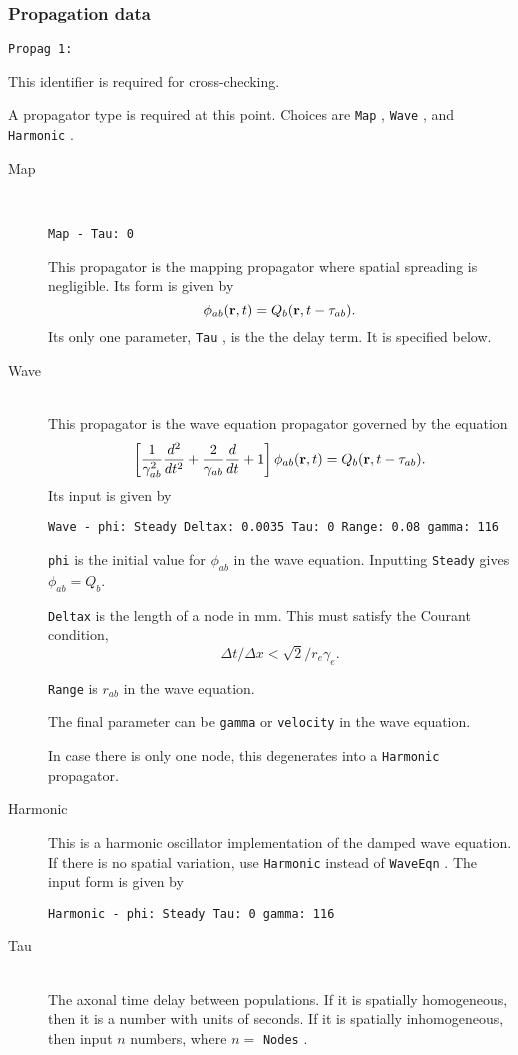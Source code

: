 \documentclass[12pt,a4paper]{article}
\newcommand{\type}[1]{ {\small\small\tt #1} }
\begin{document}
\subsubsection{Propagation data}
\label{sec:prop}
\item
	\begin{lstlisting}
Propag 1:
	\end{lstlisting}
	This identifier is required for cross-checking.
\item A propagator type is required at this point. Choices are \type{Map}, \type{Wave}, and \type{Harmonic}.
\begin{description}
	\item[Map]\ \\
	\begin{lstlisting}
Map - Tau: 0
	\end{lstlisting}
	This propagator is the mapping propagator where spatial spreading is negligible. Its form is given by
	\[\phi_{ab}({\bf r}, t) = Q_b ({\bf r}, t - \tau_{ab}).\]
	Its only one parameter, \type{Tau}, is the the delay term. It is specified below.

	\item[Wave]\ \\
	This propagator is the wave equation propagator governed by the equation
	\[\left[\frac{1}{\gamma_{ab}^2}\frac{d^2}{d t^2}+\frac{2}{\gamma_{ab}}\frac{d} {d t}+1 \right] \phi_{ab}({\bf r},t) =Q_b({\bf r},t-\tau_{ab}).\]
	Its input is given by
	\begin{lstlisting}
Wave - phi: Steady Deltax: 0.0035 Tau: 0 Range: 0.08 gamma: 116
	\end{lstlisting}
	\type{phi} is the initial value for $\phi_{ab}$ in the wave equation. Inputting \type{Steady} gives \(\phi_{ab} = Q_b\).

	\type{Deltax} is the length of a node in mm. This must satisfy the Courant condition, \[\Delta t/\Delta x<\sqrt{2}/r_e\gamma_e.\]

	\type{Range} is $r_{ab}$ in the wave equation.
	
	The final parameter can be \type{gamma} or \type{velocity} in the wave equation.

	In case there is only one node, this degenerates into a \type{Harmonic} propagator.

	\item[Harmonic]
	This is a harmonic oscillator implementation of the damped wave equation. If there is no spatial variation, use \type{Harmonic} instead of \type{WaveEqn}.
	The input form is given by 
	\begin{lstlisting}
Harmonic - phi: Steady Tau: 0 gamma: 116
	\end{lstlisting}

	\item[Tau]\ \\
	The axonal time delay between populations. If it is spatially homogeneous, then it is a number with units of seconds. If it is spatially inhomogeneous, then input \(n\) numbers, where \(n=\) \type{Nodes}.

\end{description}
\end{document}
